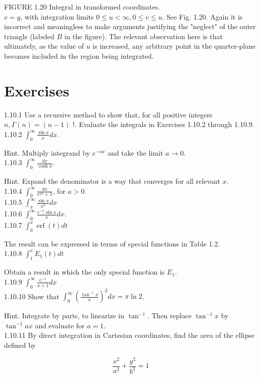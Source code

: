 \documentclass[10pt]{article}
\begin{document}
FIGURE 1.20 Integral in transformed coordinates.\\
$v=y$, with integration limits $0 \leq u<\infty, 0 \leq v \leq u$. See Fig. 1.20. Again it is incorrect and meaningless to make arguments justifying the "neglect" of the outer triangle (labeled $B$ in the figure). The relevant observation here is that ultimately, as the value of $u$ is increased, any arbitrary point in the quarter-plane becomes included in the region being integrated.

\section*{Exercises}
1.10.1 Use a recursive method to show that, for all positive integers $n, \Gamma(n)=(n-1)$ !. Evaluate the integrals in Exercises 1.10.2 through 1.10.9.\\
1.10.2 $\int_{0}^{\infty} \frac{\sin x}{x} d x$.

Hint. Multiply integrand by $e^{-a x}$ and take the limit $a \rightarrow 0$.\\
1.10.3 $\int_{0}^{\infty} \frac{d x}{\cosh x}$.

Hint. Expand the denominator is a way that converges for all relevant $x$.\\
1.10.4 $\int_{0}^{\infty} \frac{d x}{e^{a x}+1}$, for $a>0$.\\
1.10.5 $\int_{\pi}^{\infty} \frac{\sin x}{x^{2}} d x$\\
1.10.6 $\int_{0}^{\infty} \frac{e^{-x} \sin x}{x} d x$.\\
1.10.7 $\int_{0}^{x} \operatorname{erf}(t) d t$

The result can be expressed in terms of special functions in Table 1.2.\\
1.10.8 $\int_{1}^{x} E_{1}(t) d t$

Obtain a result in which the only special function is $E_{1}$.\\
1.10.9 $\int_{0}^{\infty} \frac{e^{-x}}{x+1} d x$\\
1.10.10 Show that $\int_{0}^{\infty}\left(\frac{\tan ^{-1} x}{x}\right)^{2} d x=\pi \ln 2$.

Hint. Integrate by parts, to linearize in $\tan ^{-1}$. Then replace $\tan ^{-1} x$ by $\tan ^{-1} a x$ and evaluate for $a=1$.\\
1.10.11 By direct integration in Cartesian coordinates, find the area of the ellipse defined by

$$
\frac{x^{2}}{a^{2}}+\frac{y^{2}}{b^{2}}=1
$$
\end{document}
